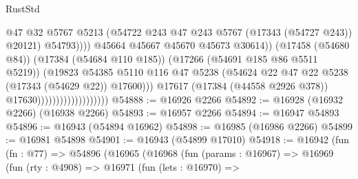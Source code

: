 \begin{lexlean}{RustStd}
\begin{coremodule}
                                                        @47
                                                        @32
                                                        @5767
                                                        @5213
                                                        (@54722
                                                          @243
                                                          @47
                                                          @243
                                                          @5767
                                                          (@17343 (@54727 @243))
                                                          @20121)
                                                        @54793))))
                                                @45664
                                                @45667
                                                @45670
                                                @45673
                                                @30614))
                                            (@17458 (@54680 @84))
                                            (@17384 (@54684 @110 @185))
                                            (@17266 (@54691 @185 @86 @5511 @5219))
                                            (@19823
                                              @54385
                                              @5110
                                              @116
                                              @47
                                              @5238
                                              (@54624
                                                @22
                                                @47
                                                @22
                                                @5238
                                                (@17343 (@54629 @22))
                                                @17600)))
                                          @17617
                                          (@17384 (@44558 @2926 @378))
                                          @17630)))))))))))))))))))
@54888 := @16926 @2266
@54892 := @16928 (@16932 @2266) (@16938 @2266)
@54893 := @16957 @2266
@54894 := @16947 @54893
@54896 := @16943 (@54894 @16962)
@54898 := @16985 (@16986 @2266)
@54899 := @16981 @54898
@54901 := @16943 (@54899 @17010)
@54918 := @16942
    (fun (fn : @77) =>
    @54896
      (@16965
        (@16968
          (fun (params : @16967) =>
          @16969
            (fun (rty : @4908) =>
            @16971
              (fun (lets : @16970) =>

\end{coremodule}
\end{lexlean}
